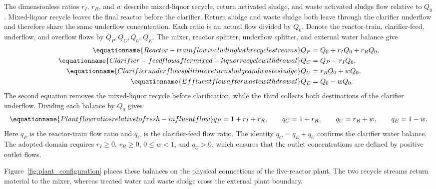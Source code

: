The dimensionless ratios $r_I$, $r_R$, and $w$ describe mixed-liquor recycle, return activated sludge, and waste activated sludge flow relative to $Q_0$. Mixed-liquor recycle leaves the final reactor before the clarifier. Return sludge and waste sludge both leave through the clarifier underflow and therefore share the same underflow concentration. Each ratio is an actual flow divided by $Q_0$. Denote the reactor-train, clarifier-feed, underflow, and overflow flows by $Q_P,Q_C,Q_U,Q_E$. The mixer, reactor splitter, underflow splitter, and external water balance give
\begin{align}
\equationname{Reactor-train flow including both recycle streams}
Q_P&=Q_0+r_IQ_0+r_RQ_0,\\
\equationname{Clarifier-feed flow after mixed-liquor recycle withdrawal}
Q_C&=Q_P-r_IQ_0,\\
\equationname{Clarifier underflow split into return sludge and waste sludge}
Q_U&=r_RQ_0+wQ_0,\\
\equationname{Effluent flow after waste withdrawal}
Q_E&=Q_0-wQ_0.
\end{align}
The second equation removes the mixed-liquor recycle before clarification, while the third collects both destinations of the clarifier underflow. Dividing each balance by $Q_0$ gives
\begin{equation}
\equationname{Plant flow ratios relative to fresh-influent flow}
q_P=1+r_I+r_R,\qquad q_C=1+r_R,\qquad
q_U=r_R+w,\qquad q_E=1-w.
\label{eq:plant_flows}
\end{equation}
Here $q_P$ is the reactor-train flow ratio and $q_C$ is the clarifier-feed flow ratio. The identity $q_C=q_E+q_U$ confirms the clarifier water balance. The adopted domain requires $r_I\ge0$, $r_R\ge0$, $0\le w<1$, and $q_U>0$, which ensures that the outlet concentrations are defined by positive outlet flows.

Figure~\ref{fig:plant_configuration} places these balances on the physical connections of the five-reactor plant. The two recycle streams return material to the mixer, whereas treated water and waste sludge cross the external plant boundary.

